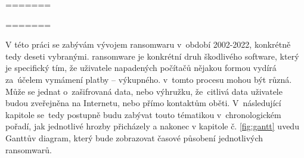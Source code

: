 \documentclass[a4paper,12pt]{article}
\begin{document}
\voffset=\evensidemargin=\oddsidemargin=\headsep=\headheight=\setlength{\parskip}{3pt}\textheight=\textwidth=

\titulnistrana
\clearpage

\voffset=\evensidemargin=\oddsidemargin=\headsep=\headheight=\setlength{\parskip}{3pt}\textheight=\textwidth=


\abstraktaklicovaslova


\clearpage
\thispagestyle{empty}


\obsah  %


\OdsazovaniOdstavcuStart %


V této práci se zabývám vývojem ransomwaru v~období 2002-2022, konkrétně tedy deseti vybranými. ransomware je konkrétní druh škodlivého software, který je specifický tím, že uživatele napadených počítačů nějakou formou vydírá za~účelem vymámení platby -- výkupného.  v~tomto procesu mohou být různá. Může se jednat o~zašifrovaná data, nebo výhružku, že~citlivá data uživatele budou zveřejněna na Internetu, nebo přímo kontaktům oběti. V~následující kapitole se~tedy postupně budu zabývat touto tématikou v~chronologickém pořadí, jak jednotlivé hrozby přicházely a nakonec v kapitole č. \ref{fig:gantt} uvedu Ganttův diagram, který bude zobrazovat časové působení jednotlivých ransomwarů.



\end{document}
